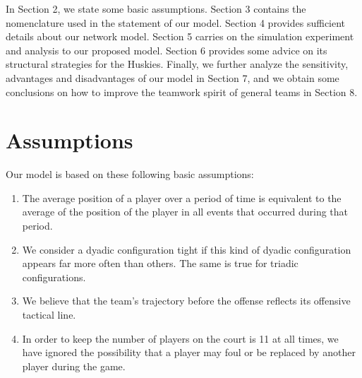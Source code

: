 \documentclass{mcmthesis}
\begin{document}
	In Section 2, we state some basic assumptions.  Section 3 contains the nomenclature used in the statement of our model.  Section 4 provides sufficient details about our network model.  Section 5 carries on the simulation experiment and analysis to our proposed model.  Section 6 provides some advice on its structural strategies for the Huskies.  Finally, we further analyze the sensitivity, advantages and disadvantages of our model in Section 7, and we obtain some conclusions on how to improve the teamwork spirit of general teams in Section 8.
\section{Assumptions}
	Our model is based on these following basic assumptions:
	\begin{enumerate}
		\item The average position of a player over a period of time is equivalent to the average of the position of the player in all events that occurred during that period.
		\item We consider a dyadic configuration tight if this kind of dyadic configuration appears far more often than others.  The same is true for triadic configurations.
		\item We believe that the team's trajectory before the offense reflects its offensive tactical line.
		\item In order to keep the number of players on the court is 11 at all times, we have ignored the possibility that a player may foul or be replaced by another player during the game.
	\end{enumerate}
\end{document}

